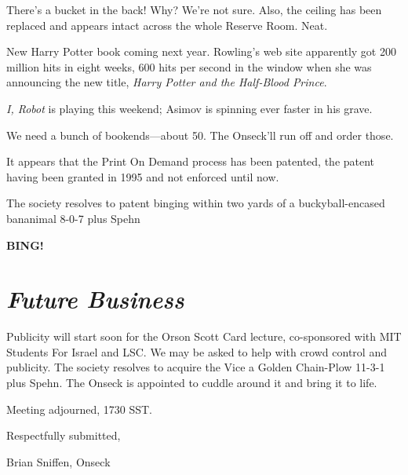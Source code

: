 \documentclass[10pt]{article}
\newcommand{\bing}{{\bf BING!} }
\newcommand{\goto}[1]{\bing \vskip 12pt \section*{{\em{#1}}}}
\newcommand{\ps}{ plus Spehn\xspace}
\begin{document}
There's a bucket in the back!  Why?  We're not sure.  Also, the
ceiling has been replaced and appears intact across the whole Reserve
Room.  Neat.

New Harry Potter book coming next year.  Rowling's web site apparently
got 200 million hits in eight weeks, 600 hits per second in the window
when she was announcing the new title, \emph{Harry Potter and the
  Half-Blood Prince}.

\emph{I, Robot} is playing this weekend; Asimov is spinning ever
faster in his grave.

We need a bunch of bookends---about 50.  The Onseck'll run off and
order those.

It appears that the Print On Demand process has been patented, the
patent having been granted in 1995 and not enforced until now.

The society resolves to patent binging within two yards of a
buckyball-encased bananimal 8-0-7\ps

\goto{Future Business}

Publicity will start soon for the Orson Scott Card lecture, co-sponsored with
MIT Students For Israel and LSC.  We may be asked to help with crowd
control and publicity.  The society resolves to acquire the Vice a
Golden Chain-Plow 11-3-1\ps.  The Onseck is appointed to cuddle around
it and bring it to life.

\vspace{12pt}

\noindent
Meeting adjourned, 1730 SST.

\vspace{18pt}

\centerline{Respectfully submitted,}
\centerline{Brian Sniffen, Onseck}
\end{document}
